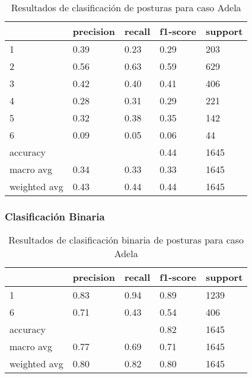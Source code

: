 \documentclass[
	spanish, %
	letterpaper, oneside
]{article}
\begin{document}
\begin{table}[htbp]
\centering
\caption{Resultados de clasificación de posturas para caso Adela}
\begin{tabular}{|l|l|l|l|l|}
\hline
\textbf{}    & \textbf{precision} & \textbf{recall} & \textbf{f1-score} & \textbf{support} \\ \hline
1            & 0.39               & 0.23            & 0.29              & 203              \\ \hline
2            & 0.56               & 0.63            & 0.59              & 629              \\ \hline
3            & 0.42               & 0.40            & 0.41              & 406              \\ \hline
4            & 0.28               & 0.31            & 0.29              & 221              \\ \hline
5            & 0.32               & 0.38            & 0.35              & 142              \\ \hline
6            & 0.09               & 0.05            & 0.06              & 44               \\ \hline
accuracy     &                    &                 & 0.44              & 1645             \\ \hline
macro avg    & 0.34               & 0.33            & 0.33              & 1645             \\ \hline
weighted avg & 0.43               & 0.44            & 0.44              & 1645             \\ \hline
\end{tabular}
\end{table}


\subsubsection{Clasificación Binaria}

\begin{table}[htbp]
\centering
\caption{Resultados de clasificación binaria de posturas para caso Adela}
\begin{tabular}{|l|l|l|l|l|}
\hline
\textbf{}    & \textbf{precision} & \textbf{recall} & \textbf{f1-score} & \textbf{support} \\ \hline
1            & 0.83               & 0.94            & 0.89              & 1239              \\ \hline
6            & 0.71               & 0.43            & 0.54              & 406               \\ \hline
accuracy     &                    &                 & 0.82              & 1645             \\ \hline
macro avg    & 0.77               & 0.69            & 0.71              & 1645             \\ \hline
weighted avg & 0.80               & 0.82            & 0.80              & 1645             \\ \hline
\end{tabular}
\end{table}
\end{document}
